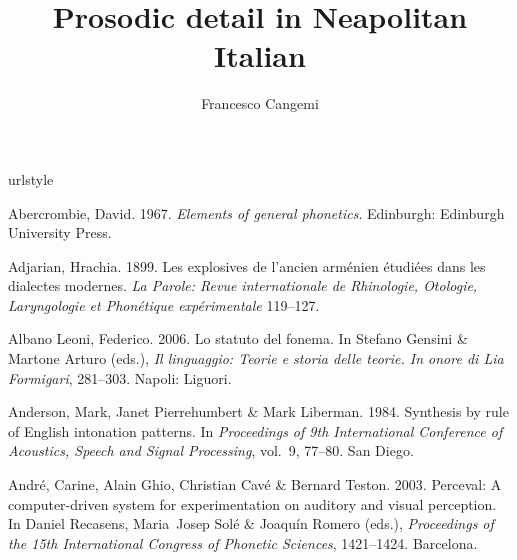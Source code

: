 \documentclass[ number=1
,series=labphon
,output=long
,url=http://langsci-press.org/catalog/book/16
,isbn=978-3-944675-01-5
]{LSP/langsci}
\title{Prosodic detail in Neapolitan Italian}
\author{Francesco Cangemi}
\begin{document}
\maketitle
\tableofcontents\enlargethispage{2em}
\mainmatter






\backmatter
{}


%

\begin{thebibliography}{284}
\providecommand{\natexlab}[1]{#1}
\providecommand{\url}[1]{#1}
\providecommand{\urlprefix}{}
\expandafter\ifx\csname urlstyle\endcsname\relax
  \providecommand{\doi}[1]{doi:\discretionary{}{}{}#1}\else
  \providecommand{\doi}{doi:\discretionary{}{}{}\begingroup
  \urlstyle{rm}\Url}\fi

Abercrombie, David. 1967.
\newblock \emph{Elements of general phonetics}.
\newblock Edinburgh: Edinburgh University Press.

Adjarian, Hrachia. 1899.
\newblock Les explosives de l'ancien arménien étudiées dans les dialectes
  modernes.
\newblock \emph{La Parole: Revue internationale de Rhinologie, Otologie,
  Laryngologie et Phonétique expérimentale} 119--127.

{Albano Leoni}, Federico. 2006.
\newblock Lo statuto del fonema.
\newblock In Stefano Gensini \& Martone Arturo (eds.), \emph{Il linguaggio:
  {T}eorie e storia delle teorie. {I}n onore di {L}ia {F}ormigari}, 281--303.
  Napoli: Liguori.

Anderson, Mark, Janet Pierrehumbert \& Mark Liberman. 1984.
\newblock Synthesis by rule of {E}nglish intonation patterns.
\newblock In \emph{Proceedings of 9th {I}nternational {C}onference of
  {A}coustics, {S}peech and {S}ignal {P}rocessing}, vol.~9, 77--80. San Diego.

Andr\'{e}, Carine, Alain Ghio, Christian Cav\'{e} \& Bernard Teston. 2003.
\newblock Perceval: {A} computer-driven system for experimentation on auditory
  and visual perception.
\newblock In Daniel Recasens, Maria~Josep Sol\'{e} \& Joaquín Romero (eds.),
  \emph{Proceedings of the 15th {I}nternational {C}ongress of {P}honetic
  {S}ciences}, 1421--1424. Barcelona.


\end{thebibliography}
\end{document}
